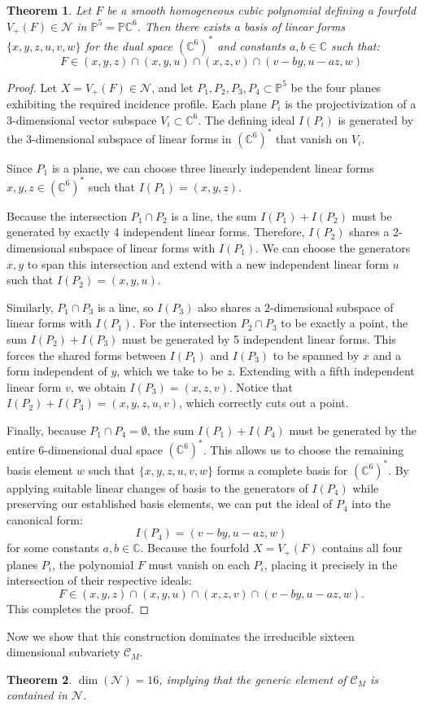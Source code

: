 \documentclass[11pt,letterpaper]{amsart} %
\newtheorem{theorem}{Theorem}[section]
\theoremstyle{definition}
\begin{document}
\begin{theorem}
Let $F$ be a smooth homogeneous cubic polynomial defining a fourfold $V_+(F) \in \mathcal{N}$ in $\mathbb{P}^5 = \mathbb{P}\mathbb{C}^6$. Then there exists a basis of linear forms $\{x,y,z,u,v,w\}$ for the dual space $(\mathbb{C}^6)^*$ and constants $a,b \in \mathbb{C}$ such that:
$$F \in ( x,y,z ) \cap ( x,y,u ) \cap ( x,z,v ) \cap ( v-by,u-az,w )$$
\end{theorem}

\begin{proof}
Let $X = V_+(F) \in \mathcal{N}$, and let $P_1,P_2,P_3,P_4 \subset \mathbb{P}^5$ be the four planes exhibiting the required incidence profile. Each plane $P_i$ is the projectivization of a 3-dimensional vector subspace $V_i \subset \mathbb{C}^6$. The defining ideal $I(P_i)$ is generated by the 3-dimensional subspace of linear forms in $(\mathbb{C}^6)^*$ that vanish on $V_i$.

Since $P_1$ is a plane, we can choose three linearly independent linear forms $x,y,z \in (\mathbb{C}^6)^*$ such that $I(P_1) = ( x,y,z )$. 

Because the intersection $P_1 \cap P_2$ is a line, the sum $I(P_1) + I(P_2)$ must be generated by exactly 4 independent linear forms. Therefore, $I(P_2)$ shares a 2-dimensional subspace of linear forms with $I(P_1)$. We can choose the generators $x,y$ to span this intersection and extend with a new independent linear form $u$ such that $I(P_2) = ( x,y,u )$.

Similarly, $P_1 \cap P_3$ is a line, so $I(P_3)$ also shares a 2-dimensional subspace of linear forms with $I(P_1)$. For the intersection $P_2 \cap P_3$ to be exactly a point, the sum $I(P_2) + I(P_3)$ must be generated by 5 independent linear forms. This forces the shared forms between $I(P_1)$ and $I(P_3)$ to be spanned by $x$ and a form independent of $y$, which we take to be $z$. Extending with a fifth independent linear form $v$, we obtain $I(P_3) = ( x,z,v )$. Notice that $I(P_2) + I(P_3) = ( x,y,z,u,v )$, which correctly cuts out a point.

Finally, because $P_1 \cap P_4 = \emptyset$, the sum $I(P_1) + I(P_4)$ must be generated by the entire 6-dimensional dual space $(\mathbb{C}^6)^*$. This allows us to choose the remaining basis element $w$ such that $\{x,y,z,u,v,w\}$ forms a complete basis for $(\mathbb{C}^6)^*$. By applying suitable linear changes of basis to the generators of $I(P_4)$ while preserving our established basis elements, we can put the ideal of $P_4$ into the canonical form:
$$I(P_4) = ( v-by,u-az,w )$$
for some constants $a,b \in \mathbb{C}$. Because the fourfold $X = V_+(F)$ contains all four planes $P_i$, the polynomial $F$ must vanish on each $P_i$, placing it precisely in the intersection of their respective ideals:
$$F \in ( x,y,z ) \cap ( x,y,u ) \cap ( x,z,v ) \cap ( v-by,u-az,w ).$$
This completes the proof.
\end{proof}
Now we show that this construction dominates the irreducible sixteen dimensional subvariety $\mathcal{C}_M$.
\begin{theorem}
$\dim(\mathcal{N}) = 16$, implying that the generic element of $\mathcal{C}_M$ is contained in $\mathcal{N}$. %
\end{theorem}
\end{document}
